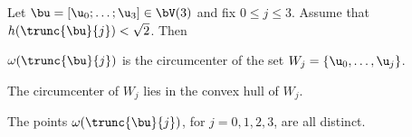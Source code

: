 \begin{lemma}\label{lemma:v2} 
Let $\bu=[\u_0;\ldots;\u_3]\in \bV(3)$ and fix $0\le j\le 3$.
Assume that $h(\trunc{\bu}{j})<\sqrt2$.
Then 
\begin{nomerate}
\item {} $\omega(\trunc{\bu}{j})$ is the circumcenter of the
set $W_j =\{ \u_0,\ldots, \u_j\}$.
\item {} The circumcenter of $W_j$ lies in the convex
hull of $W_j$.
\item {} The points $\omega(\trunc{\bu}{j})$, for
$j=0,1,2,3$, are all distinct.
\end{nomerate}
\end{lemma}
%

